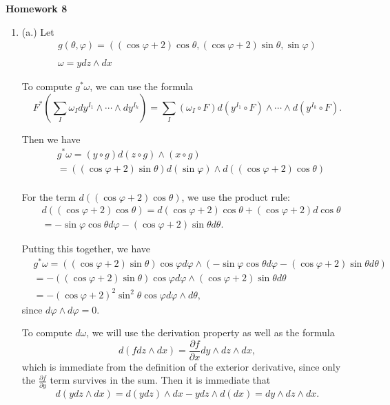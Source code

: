 \documentclass[11pt, reqno]{article}
\theoremstyle{plain}
\theoremstyle{definition}
\theoremstyle{remark}
\renewcommand{\phi}{\varphi}
\begin{document}
\topmargin=-40pt
\renewcommand{\headrulewidth}{1pt}
\renewcommand{\headsep}{20pt}
\thispagestyle{fancy}

{\Huge \bfseries \noindent Homework 8}

\begin{enumerate}
    \item[1.] (a.) Let 
    \begin{gather*}
        g(\theta, \phi) = \left((\cos\phi + 2)\cos\theta,(\cos\phi + 2)\sin\theta, \sin\phi\right)\\
        \ \\
        \omega = y dz\wedge dx
    \end{gather*}

    To compute $g^*\omega$, we can use the formula 
    \[
        F^*\left(\sum_I \omega_I dy^{I_1}\wedge \cdots\wedge dy^{I_k}\right) = \sum_I
        (\omega_I \circ F)d(y^{I_1}\circ F) \wedge \cdots \wedge d(y^{I_k}\circ F).
    \]

    Then we have
    \begin{align*}
        &g^*\omega = (y \circ g)d(z\circ g)\wedge(x \circ g)\\
        &= ((\cos\phi + 2)\sin\theta)d(\sin\phi)\wedge d((\cos\phi +2)\cos\theta)\\
    \end{align*}

    For the term $d((\cos\phi + 2)\cos\theta)$, we use the product rule:
    \begin{align*}
        &d((\cos\phi + 2)\cos\theta) = d(\cos\phi + 2)\cos\theta + (\cos\phi + 2)d\cos\theta\\
        & = -\sin\phi\cos\theta d\phi - (\cos\phi + 2)\sin\theta d\theta.
    \end{align*}

    Putting this together, we have
    \begin{align*}
        &g^*\omega = ((\cos\phi + 2)\sin\theta)\cos\phi d\phi\wedge (-\sin\phi\cos\theta d\phi - (\cos\phi + 2)\sin\theta d\theta)\\
        &= -((\cos\phi + 2)\sin\theta)\cos\phi d\phi \wedge (\cos\phi + 2)\sin\theta d\theta\\
        &= -(\cos\phi + 2)^2 \sin^2\theta\cos\phi d\phi \wedge d\theta,
    \end{align*}
    since $d\phi \wedge d\phi = 0$.

    To compute $d\omega$, we will use the derivation property as well as the formula
    \[
        d(f dz \wedge dx) = \frac{\partial f}{\partial x} dy \wedge dz \wedge dx,
    \]
    which is immediate from the definition of the exterior derivative, since only the $\frac{\partial f}{\partial y}$ term survives
    in the sum. Then it is immediate that 
    \[
        d(y dz\wedge dx) = d(y dz) \wedge dx - y dz \wedge d(dx) = dy \wedge dz \wedge dx.
    \]


\end{enumerate}
\end{document}
